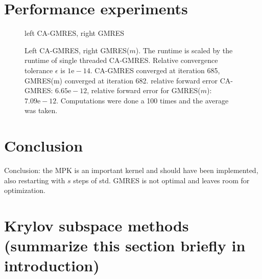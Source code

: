 \documentclass{scrartcl}
\numberwithin{equation}{section}
\begin{document}
\section{Performance experiments}
\begin{figure}[H]
	\centering
	\resizebox{1.0\textwidth}{!}{}
	\caption{left CA-GMRES, right GMRES}
\end{figure}
\begin{figure}[H]
	\centering
	\resizebox{1.0\textwidth}{!}{}
	\caption{Left CA-GMRES, right GMRES($m$). The runtime is scaled by the runtime of single threaded CA-GMRES. Relative convergence tolerance $\epsilon$ is $1\text{e}-14$. CA-GMRES converged at iteration 685, GMRES(m) converged at iteration 682. relative forward error CA-GMRES: $6.65\text{e}-12$, relative forward error for GMRES($m$): $7.09\text{e}-12$. Computations were done a 100 times and the average was taken.
 }
	\label{fig:pwtk_scale}
\end{figure}

\section{Conclusion}
Conclusion: the MPK is an important kernel and should have been implemented, also restarting with $s$ steps of std. GMRES is not optimal and leaves room for optimization.

\iffalse
\section*{Krylov subspace methods (summarize this section briefly in introduction)}
\end{document}
